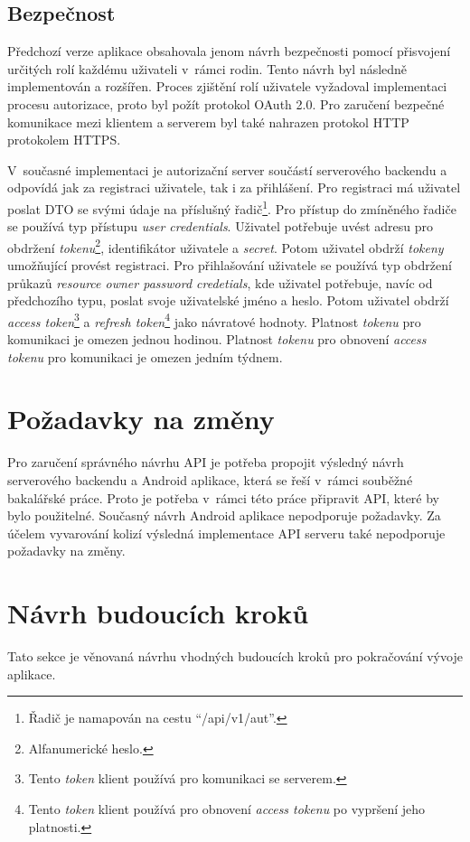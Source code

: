     \subsection{Bezpečnost}
        Předchozí verze aplikace obsahovala jenom návrh bezpečnosti pomocí přisvojení určitých rolí každému uživateli v~rámci rodin. Tento návrh byl následně implementován a rozšířen. Proces zjištění rolí uživatele vyžadoval implementaci procesu autorizace, proto byl požít protokol OAuth 2.0. Pro zaručení bezpečné komunikace mezi klientem a serverem byl také nahrazen protokol HTTP protokolem HTTPS.
        
        V~současné implementaci je autorizační server součástí serverového backendu a odpovídá jak za registraci uživatele, tak i za přihlášení. Pro registraci má uživatel poslat DTO se svými údaje na příslušný řadič\footnote{Řadič je namapován na cestu \enquote{/api/v1/aut}.}. Pro přístup do zmíněného řadiče se používá typ přístupu \textit{user credentials}. Uživatel potřebuje uvést adresu pro obdržení \textit{tokenu}\footnote{Alfanumerické heslo.}, identifikátor uživatele a \textit{secret}. Potom uživatel obdrží \textit{tokeny} umožňující provést registraci.
        Pro přihlašování uživatele se používá typ obdržení průkazů \textit{resource owner password credetials}, kde uživatel potřebuje, navíc od předchozího typu, poslat svoje uživatelské jméno a heslo. Potom uživatel obdrží \textit{access token}\footnote{Tento \textit{token} klient používá pro komunikaci se serverem.} a \textit{refresh token}\footnote{Tento \textit{token} klient používá pro obnovení \textit{access tokenu} po vypršení jeho platnosti.} jako návratové hodnoty. Platnost \textit{tokenu} pro komunikaci je omezen jednou hodinou. Platnost \textit{tokenu} pro obnovení \textit{access tokenu} pro komunikaci je omezen jedním týdnem.
        
    \section{Požadavky na změny}
        Pro zaručení správného návrhu API je potřeba propojit výsledný návrh serverového backendu a Android aplikace, která se řeší v~rámci souběžné bakalářské práce. Proto je potřeba v~rámci této  práce připravit API, které by bylo použitelné. Současný návrh Android aplikace nepodporuje požadavky. Za účelem vyvarování kolizí výsledná implementace API serveru také nepodporuje požadavky na změny.

\section{Návrh budoucích kroků}
    Tato sekce je věnovaná návrhu vhodných budoucích kroků pro pokračování vývoje aplikace.
    
